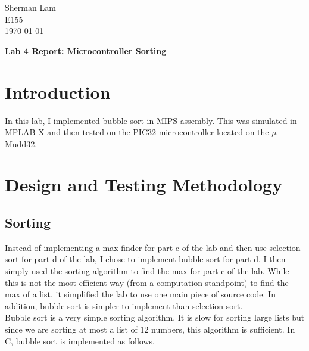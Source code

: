 \documentclass[11pt]{article}
\begin{document}
\begin{flushleft}
Sherman Lam
\\E155
\\ \today
\end{flushleft}


\begin{center}
\begin{Large}
\textbf{Lab 4 Report: Microcontroller Sorting}
\end{Large}
\end{center}




\section{Introduction}
\label{sec:intro}

In this lab, I implemented bubble sort in MIPS assembly. This was simulated in MPLAB-X and then tested on the PIC32 microcontroller located on the $\mu$Mudd32.



\section{Design and Testing Methodology}

\subsection{Sorting}

Instead of implementing a max finder for part c of the lab and then use selection sort for part d of the lab, I chose to implement bubble sort for part d. I then simply used the sorting algorithm to find the max for part c of the lab. While this is not the most efficient way (from a computation standpoint) to find the max of a list, it simplified the lab to use one main piece of source code. In addition, bubble sort is simpler to implement than selection sort. \\

Bubble sort is a very simple sorting algorithm. It is slow for sorting large lists but since we are sorting at most a list of 12 numbers, this algorithm is sufficient. In C, bubble sort is implemented as follows. \\
\end{document}
